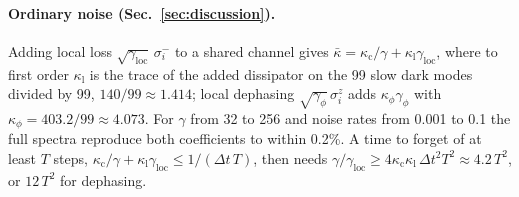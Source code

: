 \paragraph{Ordinary noise (Sec.~\ref{sec:discussion}).}
Adding local loss $\sqrt{\gamma_{\mathrm{loc}}}\,\sigma_i^-$ to a shared channel gives
$\bar\kappa=\kappa_{\mathrm c}/\gamma+\kappa_{\mathrm l}\gamma_{\mathrm{loc}}$, where to first order $\kappa_{\mathrm l}$
is the trace of the added dissipator on the 99 slow dark modes divided by 99, $140/99\approx1.414$; local dephasing
$\sqrt{\gamma_\phi}\,\sigma_i^z$ adds $\kappa_\phi\gamma_\phi$ with $\kappa_\phi=403.2/99\approx4.073$. For $\gamma$ from
32 to 256 and noise rates from 0.001 to 0.1 the full spectra reproduce both coefficients to within 0.2\%. A time to
forget of at least $T$ steps, $\kappa_{\mathrm c}/\gamma+\kappa_{\mathrm l}\gamma_{\mathrm{loc}}\le1/(\Delta t\,T)$, then
needs $\gamma/\gamma_{\mathrm{loc}}\ge4\kappa_{\mathrm c}\kappa_{\mathrm l}\,\Delta t^2T^2\approx4.2\,T^2$, or $12\,T^2$
for dephasing.
